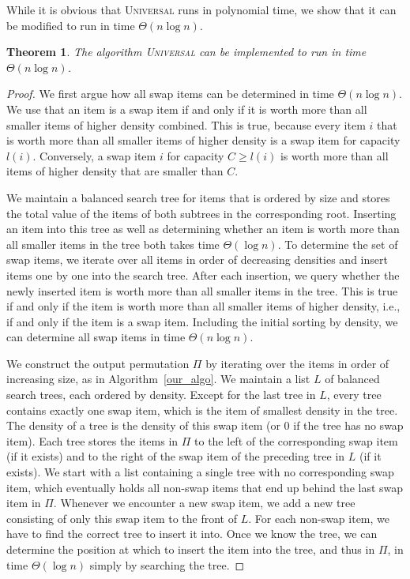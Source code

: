 \documentclass[11pt]{article}
\newcommand{\noun}[1]{\textsc{#1}}
\newtheorem{theorem}{Theorem}
\begin{document}
While it is obvious that \noun{Universal} runs in polynomial time,
we show that it can be modified to run in time $\Theta(n\log n)$. 
\begin{theorem}
The algorithm \noun{Universal} can be implemented to run in time $\Theta(n\log n)$.\label{thm:running time
Universal}\end{theorem}
\begin{proof}
We first argue how all swap items can be determined in time $\Theta(n\log n)$.
We use that an item is a swap item if and only if it is worth more
than all smaller items of higher density combined. This is true, because
every item $i$ that is worth more than all smaller items of higher
density is a swap item for capacity $l(i)$. Conversely, a swap item
$i$ for capacity $C\geq l(i)$ is worth more than all items of higher
density that are smaller than $C$.

We maintain a balanced search tree for items that is ordered by size
and stores the total value of the items of both subtrees in the corresponding
root. Inserting an item into this tree as well as determining whether
an item is worth more than all smaller items in the tree both takes
time $\Theta(\log n)$. To determine the set of swap items, we iterate
over all items in order of decreasing densities and insert items one
by one into the search tree. After each insertion, we query whether
the newly inserted item is worth more than all smaller items in the
tree. This is true if and only if the item is worth more than all
smaller items of higher density, i.e., if and only if the item is
a swap item. Including the initial sorting by density, we can determine
all swap items in time $\Theta(n\log n)$.

We construct the output permutation $\Pi$ by iterating over the items
in order of increasing size, as in Algorithm~\ref{our_algo}. We
maintain a list $L$ of balanced search trees, each ordered by density.
Except for the last tree in $L$, every tree contains exactly one
swap item, which is the item of smallest density in the tree. The
density of a tree is the density of this swap item (or 0 if the tree
has no swap item). Each tree stores the items in $\Pi$ to the left
of the corresponding swap item (if it exists) and to the right of
the swap item of the preceding tree in $L$ (if it exists). We start
with a list containing a single tree with no corresponding swap item,
which eventually holds all non-swap items that end up behind the last
swap item in $\Pi$. Whenever we encounter a new swap item, we add
a new tree consisting of only this swap item to the front of $L$.
For each non-swap item, we have to find the correct tree to insert
it into. Once we know the tree, we can determine the position at which
to insert the item into the tree, and thus in $\Pi$, in time $\Theta(\log n)$
simply by searching the tree. 


\end{proof}
\end{document}
